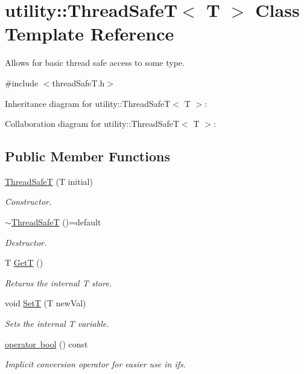 \hypertarget{classutility_1_1ThreadSafeT}{}\section{utility\+::Thread\+SafeT$<$ T $>$ Class Template Reference}
\label{classutility_1_1ThreadSafeT}


Allows for basic thread safe access to some type.  




{\ttfamily \#include $<$thread\+Safe\+T.\+h$>$}



Inheritance diagram for utility\+::Thread\+SafeT$<$ T $>$\+:


Collaboration diagram for utility\+::Thread\+SafeT$<$ T $>$\+:
\subsection*{Public Member Functions}
\begin{DoxyCompactItemize}
\item 
\mbox{\hyperlink{classutility_1_1ThreadSafeT_a7cdb74cfeaa11742df2953be2e43648c}{Thread\+SafeT}} (T initial)
\begin{DoxyCompactList}\small\item\em Constructor. \end{DoxyCompactList}\item 
\mbox{\label{classutility_1_1ThreadSafeT_a1869bec4c8a169389a8b83ab5e772efe}} 
\mbox{\hyperlink{classutility_1_1ThreadSafeT_a1869bec4c8a169389a8b83ab5e772efe}{$\sim$\+Thread\+SafeT}} ()=default
\begin{DoxyCompactList}\small\item\em Destructor. \end{DoxyCompactList}\item 
T \mbox{\hyperlink{classutility_1_1ThreadSafeT_ad9e354cd1ee317c01c282ef2b75e786e}{GetT}} ()
\begin{DoxyCompactList}\small\item\em Returns the internal T store. \end{DoxyCompactList}\item 
void \mbox{\hyperlink{classutility_1_1ThreadSafeT_aa9b826970186d0826179c4346707c3eb}{SetT}} (T new\+Val)
\begin{DoxyCompactList}\small\item\em Sets the internal T variable. \end{DoxyCompactList}\item 
\mbox{\hyperlink{classutility_1_1ThreadSafeT_a14a00e1e039c17524cc58808975c3198}{operator bool}} () const
\begin{DoxyCompactList}\small\item\em Implicit conversion operator for easier use in ifs. \end{DoxyCompactList}\end{DoxyCompactItemize}


